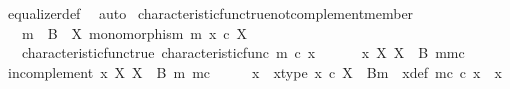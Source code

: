 \begin{isabellebody}
\ equalizer{\isacharunderscore}{\kern0pt}def\ \isamarkupfalse%
\ auto%
\endisatagproof
{\isafoldproof}%
%
\isadelimproof
\isanewline
%
\endisadelimproof
\isanewline
{}\isamarkupfalse%
\ characteristic{\isacharunderscore}{\kern0pt}func{\isacharunderscore}{\kern0pt}true{\isacharunderscore}{\kern0pt}not{\isacharunderscore}{\kern0pt}complement{\isacharunderscore}{\kern0pt}member{\isacharcolon}{\kern0pt}\isanewline
\ \ \ {\isachardoublequoteopen}m\ {\isacharcolon}{\kern0pt}\ B\ {\isasymrightarrow}\ X{\isachardoublequoteclose}\ {\isachardoublequoteopen}monomorphism\ m{\isachardoublequoteclose}\ {\isachardoublequoteopen}x\ {\isasymin}\isactrlsub c\ X{\isachardoublequoteclose}\isanewline
\ \ \ characteristic{\isacharunderscore}{\kern0pt}func{\isacharunderscore}{\kern0pt}true{\isacharcolon}{\kern0pt}\ {\isachardoublequoteopen}characteristic{\isacharunderscore}{\kern0pt}func\ m\ {\isasymcirc}\isactrlsub c\ x\ {\isacharequal}{\kern0pt}\ {\isasymt}{\isachardoublequoteclose}\isanewline
\ \ \ {\isachardoublequoteopen}{\isasymnot}\ x\ {\isasymin}\isactrlbsub X\isactrlesub \ {\isacharparenleft}{\kern0pt}X\ {\isasymsetminus}\ {\isacharparenleft}{\kern0pt}B{\isacharcomma}{\kern0pt}\ m{\isacharparenright}{\kern0pt}{\isacharcomma}{\kern0pt}m\isactrlsup c{\isacharparenright}{\kern0pt}{\isachardoublequoteclose}\isanewline
%
\isadelimproof
%
\endisadelimproof
%
\isatagproof
{}\isamarkupfalse%
\isanewline
\ \ \isamarkupfalse%
\ in{\isacharunderscore}{\kern0pt}complement{\isacharcolon}{\kern0pt}\ {\isachardoublequoteopen}x\ {\isasymin}\isactrlbsub X\isactrlesub \ {\isacharparenleft}{\kern0pt}X\ {\isasymsetminus}\ {\isacharparenleft}{\kern0pt}B{\isacharcomma}{\kern0pt}\ m{\isacharparenright}{\kern0pt}{\isacharcomma}{\kern0pt}\ m\isactrlsup c{\isacharparenright}{\kern0pt}{\isachardoublequoteclose}\isanewline
\ \ \isamarkupfalse%
\ \isamarkupfalse%
\ x{\isacharprime}{\kern0pt}\ \ x{\isacharprime}{\kern0pt}{\isacharunderscore}{\kern0pt}type{\isacharcolon}{\kern0pt}\ {\isachardoublequoteopen}x{\isacharprime}{\kern0pt}\ {\isasymin}\isactrlsub c\ X\ {\isasymsetminus}\ {\isacharparenleft}{\kern0pt}B{\isacharcomma}{\kern0pt}m{\isacharparenright}{\kern0pt}{\isachardoublequoteclose}\ \ x{\isacharprime}{\kern0pt}{\isacharunderscore}{\kern0pt}def{\isacharcolon}{\kern0pt}\ {\isachardoublequoteopen}m\isactrlsup c\ {\isasymcirc}\isactrlsub c\ x{\isacharprime}{\kern0pt}\ {\isacharequal}{\kern0pt}\ x{\isachardoublequoteclose}\isanewline

\end{isabellebody}
